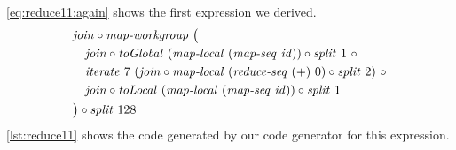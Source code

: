\autoref{eq:reduce11:again} shows the first expression we derived.
\begin{align}
  \begin{aligned}
    &\join \circ \mapWorkgroup\ \big(\\
    &\quad \join \circ \toGlobal\ (\mapLocal\ (\mapSeq\ \id)) \circ \splitN\ 1\ \circ\\
    &\quad \iterateN\ 7\ (\join \circ \mapLocal\ (\reduceSeq\ (+)\ 0) \circ \splitN\ 2)\ \circ\\
    &\quad \join \circ \toLocal\ (\mapLocal\ (\mapSeq\ \id)) \circ \splitN\ 1\\
    &\big) \circ \splitN\ 128
  \end{aligned}
  \label{eq:reduce11:again}
\end{align}
\autoref{lst:reduce11} shows the \OpenCL code generated by our code generator for this expression.
%
